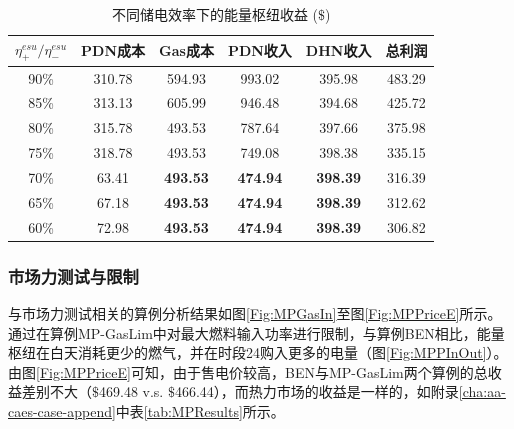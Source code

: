 \begin{table}[!t]
\scriptsize
\renewcommand{\arraystretch}{1.3}
\renewcommand{\tabcolsep}{1em}
\caption{不同储电效率下的能量枢纽收益 ($\$$)}
\centering
\begin{tabular}{cccccc}
\toprule
$\eta_{+}^{esu}/\eta_{-}^{esu}$ & {PDN成本}& {Gas成本} & {PDN收入} & {DHN收入} & {总利润}\\
\midrule
90\%   & 310.78   & 594.93   & 993.02   & 395.98   & 483.29 \\
85\%   & 313.13   & 605.99   & 946.48   & 394.68   & 425.72 \\
80\%   & 315.78   & 493.53   & 787.64   & 397.66   & 375.98 \\
75\%   & 318.78   & 493.53   & 749.08   & 398.38   & 335.15 \\
70\%   & 63.41    & \textbf{493.53}   & \textbf{474.94}   & \textbf{398.39}   & 316.39 \\
65\%   & 67.18    & \textbf{493.53}   & \textbf{474.94}   & \textbf{398.39}   & 312.62 \\
60\%   & 72.98    & \textbf{493.53}   & \textbf{474.94}   & \textbf{398.39}   & 306.82 \\
\bottomrule
\end{tabular}
\label{tab:SenResults}
\end{table}

\subsubsection{市场力测试与限制}
与市场力测试相关的算例分析结果如图\ref{Fig:MPGasIn}至图\ref{Fig:MPPriceE}所示。通过在算例{MP-GasLim}中对最大燃料输入功率进行限制，与算例{BEN}相比，能量枢纽在白天消耗更少的燃气，并在时段24购入更多的电量（图\ref{Fig:MPPInOut}）。由图\ref{Fig:MPPriceE}可知，由于售电价较高，{BEN}与{MP-GasLim}两个算例的总收益差别不大（$\$$469.48 v.s. $\$$466.44），而热力市场的收益是一样的，如附录\ref{cha:aa-caes-case-append}中表\ref{tab:MPResults}所示。


